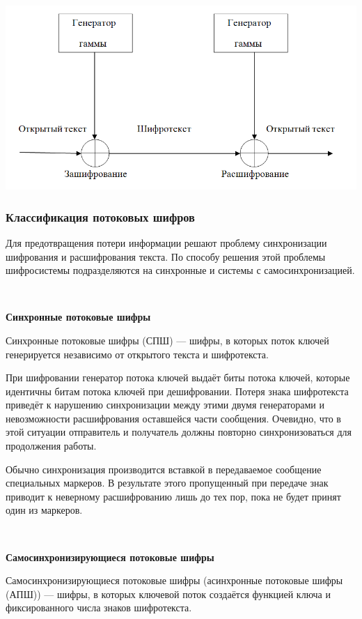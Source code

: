 \documentclass[a4paper]{report}
\begin{document}
~

\includegraphics[scale=0.5]{Gamma12}
{\\}



\subsubsection{Классификация потоковых шифров}
Для предотвращения потери информации решают проблему синхронизации шифрования и расшифрования текста.
По способу решения этой проблемы шифросистемы подразделяются на синхронные и системы с самосинхронизацией.

~

\textbf{Синхронные потоковые шифры}

Синхронные потоковые шифры (СПШ) — шифры, в которых поток ключей генерируется независимо от открытого текста и шифротекста.

При шифровании генератор потока ключей выдаёт биты потока ключей, которые идентичны битам потока ключей при дешифровании. Потеря знака шифротекста приведёт к нарушению синхронизации между этими двумя генераторами и невозможности расшифрования оставшейся части сообщения. Очевидно, что в этой ситуации отправитель и получатель должны повторно синхронизоваться для продолжения работы.

Обычно синхронизация производится вставкой в передаваемое сообщение специальных маркеров. В результате этого пропущенный при передаче знак приводит к неверному расшифрованию лишь до тех пор, пока не будет принят один из маркеров.

~

\textbf{Самосинхронизирующиеся потоковые шифры}

Самосинхронизирующиеся потоковые шифры (асинхронные потоковые шифры (АПШ)) — шифры, в которых ключевой поток создаётся функцией ключа и фиксированного числа знаков шифротекста.
\end{document}
